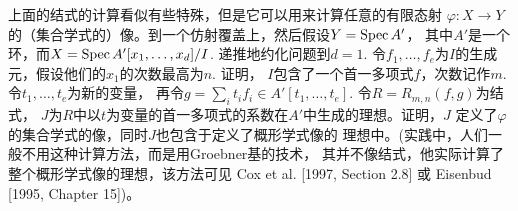 \begin{exe}\label{exe:5.20}
    上面的结式的计算看似有些特殊，但是它可以用来计算任意的有限态射
    $\varphi:X\to Y$的（集合学式的）像。到一个仿射覆盖上，然后假设$Y=\operatorname{Spec} A'$，
    其中$A'$是一个环，而$X=\operatorname{Spec} A'[x_1,\dots,x_d]/I$. 递推地约化问题到$d=1$.
    令$f_1,\dots,f_e$为$I$的生成元，假设他们的$x_1$的次数最高为$n$. 证明，
    $I$包含了一个首一多项式$f$，次数记作$m$. 令$t_1,\dots,t_e$为新的变量，
    再令$g=\sum_it_if_i\in A'[t_1,\dots,t_e]$. 令$R=R_{m,n}(f,g)$为结式，
    $J$为$R$中以$t$为变量的首一多项式的系数在$A'$中生成的理想。证明，$J$
    定义了$\varphi$的集合学式的像，同时$J$也包含于定义了概形学式像的
    理想中。(实践中，人们一般不用这种计算方法，而是用Gr\:oebner基的技术，
    其并不像结式，他实际计算了整个概形学式像的理想，该方法可见 
    Cox et al. [1997, Section 2.8] 或 Eisenbud [1995, Chapter 15])。
\end{exe}

